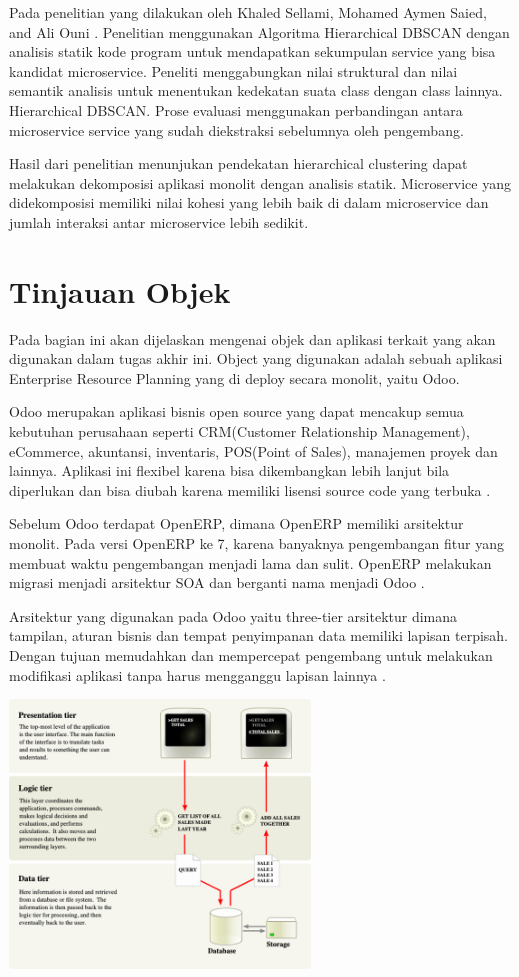 Pada penelitian yang dilakukan oleh Khaled Sellami, Mohamed Aymen Saied, and Ali Ouni \cite{ECD}. Penelitian menggunakan Algoritma Hierarchical DBSCAN dengan analisis statik kode program untuk mendapatkan sekumpulan service yang bisa kandidat microservice.  Peneliti menggabungkan nilai struktural dan nilai semantik analisis untuk menentukan kedekatan suata class dengan class lainnya.
Hierarchical DBSCAN. Prose evaluasi menggunakan perbandingan antara microservice service yang sudah diekstraksi sebelumnya oleh pengembang. 

Hasil dari penelitian menunjukan pendekatan hierarchical clustering dapat melakukan dekomposisi aplikasi monolit dengan analisis statik. Microservice yang didekomposisi memiliki nilai kohesi yang lebih baik di dalam microservice dan  jumlah interaksi antar microservice lebih sedikit.
\\
\section{Tinjauan Objek}
Pada bagian ini akan dijelaskan mengenai objek dan aplikasi terkait yang akan digunakan dalam tugas akhir ini. Object yang digunakan adalah sebuah aplikasi Enterprise Resource Planning yang di deploy secara monolit, yaitu Odoo.

Odoo merupakan aplikasi bisnis open source yang dapat mencakup semua kebutuhan perusahaan seperti CRM(Customer Relationship Management), eCommerce, akuntansi, inventaris, POS(Point of Sales), manajemen proyek dan lainnya. Aplikasi ini flexibel karena bisa dikembangkan lebih lanjut bila diperlukan dan bisa diubah karena memiliki lisensi source code yang terbuka \cite{odoo}. 

Sebelum Odoo terdapat OpenERP, dimana OpenERP memiliki arsitektur monolit. Pada versi OpenERP ke 7, karena banyaknya pengembangan fitur yang membuat waktu pengembangan menjadi lama dan sulit. OpenERP melakukan migrasi menjadi arsitektur SOA dan berganti nama menjadi Odoo \cite{5FA}.

Arsitektur yang digunakan pada Odoo yaitu three-tier arsitektur dimana tampilan, aturan bisnis dan tempat penyimpanan data memiliki lapisan terpisah. Dengan tujuan memudahkan dan mempercepat pengembang untuk melakukan modifikasi aplikasi tanpa harus mengganggu lapisan lainnya \cite{odoo}.

\begin{center}
	\includegraphics[width=8cm]{img/arsitekturOdoo.PNG}
	\label{fig:asd}
\end{center}

